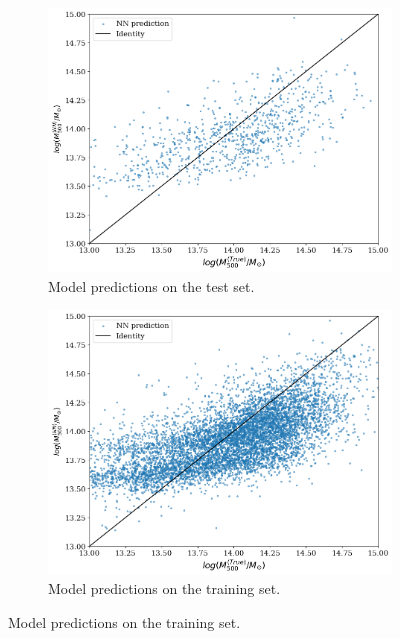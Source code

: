 \begin{figure}[H]
\centering
\begin{subfigure}{.46\textwidth}
  \centering
  \includegraphics[width=\linewidth]{images/Chapter4/EffB7/eff_test.png}
  \caption{Model predictions on the test set.}
  \label{fig:best_perf_EffB7_a}
\end{subfigure}%
\hspace{.6em}
\begin{subfigure}{.46\textwidth}
  \centering
  \includegraphics[width=\linewidth]{images/Chapter4/EffB7/eff_train.png}
  \caption{Model predictions on the training set.}
  \label{fig:best_perf_EffB7_b}
\end{subfigure}

\end{figure}
